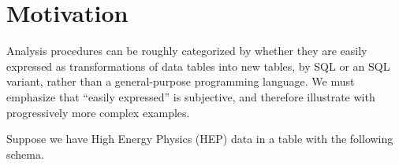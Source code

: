 \documentclass[10pt, conference, compsocconf]{IEEEtran}
\begin{document}









%
%
%

\section{Motivation}

Analysis procedures can be roughly categorized by whether they are easily expressed as transformations of data tables into new tables, by SQL or an SQL variant, rather than a general-purpose programming language. We must emphasize that ``easily expressed'' is subjective, and therefore illustrate with progressively more complex examples.

Suppose we have High Energy Physics (HEP) data in a table with the following schema.

\vspace{0.15 cm}
\end{document}
